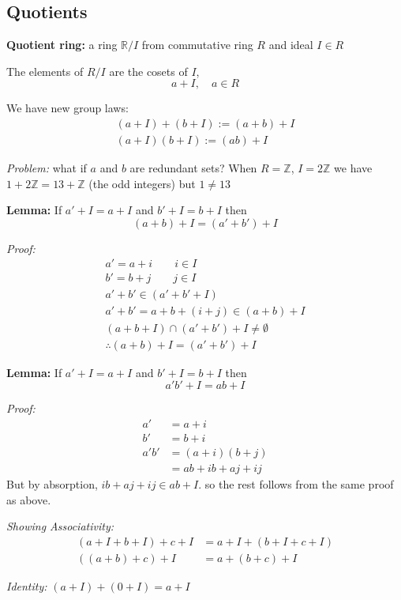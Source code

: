 \documentclass[12pt]{report}
\newcommand{\R}{\mathbb{R}}
\newcommand{\Z}{\mathbb{Z}}
\begin{document}
\subsection*{Quotients}
\textbf{Quotient ring:} a ring $\R/I$ from commutative ring $R$ and ideal $I \in R$ 

The elements of $R/I$ are the cosets of $I$,
\[a + I, \quad a \in R\]

We have new group laws:
\begin{align*}
    (a + I) + (b + I) := (a + b) + I\\
    (a + I)(b + I) := (ab) + I
\end{align*}

\emph{Problem:} what if $a$ and $b$ are redundant sets? When $R = \Z$, $I = 2\Z$ we have $1 + 2\Z = 13 + \Z$ (the odd integers) but $1 \neq 13$

\textbf{Lemma:} If $a' +I = a+ I$ and $b' + I = b + I$ then 
\[(a + b) + I = (a' + b') + I\]

\emph{Proof:}
\begin{align*}
    a' = a+ i \qquad i \in I\\
    b' = b +j \qquad j \in I\\
    a' + b' \in (a' + b' + I)\\
    a' + b' = a + b + (i + j) \in (a + b) + I\\
    (a + b + I) \cap (a' + b') + I \neq \emptyset\\
    \therefore (a + b) + I = (a' + b') + I 
\end{align*}

\textbf{Lemma:} If $a' +I = a+ I$ and $b' + I = b + I$ then  
\[a' b' + I = ab + I\]

\emph{Proof:} 
\begin{align*}
    a' &= a + i \\
    b' &= b + i\\
    a'b' &= (a + i)(b+j)\\
    &= ab + ib + aj + ij
\end{align*}
But by absorption, $ib + aj + ij \in ab + I$. so the rest follows from the same proof as above. 

\emph{Showing Associativity:} 
\begin{align*}
    (a + I + b + I) + c + I &= a + I + (b + I + c + I)\\
    ((a + b) + c) + I &= a + (b + c) + I
\end{align*}

\emph{Identity:} $(a + I) + (0 + I) = a + I$
\end{document}
